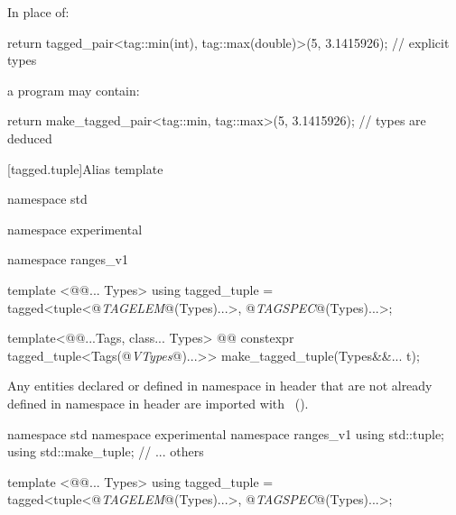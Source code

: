 {\begin{itemdescr}
\pnum
\enterexample
In place of:

\begin{codeblock}
  return tagged_pair<tag::min(int), tag::max(double)>(5, 3.1415926);   // explicit types
\end{codeblock}

a \Cpp program may contain:

\begin{codeblock}
  return make_tagged_pair<tag::min, tag::max>(5, 3.1415926);           // types are deduced
\end{codeblock}
\exitexample
\end{itemdescr}

{\color{newclr}
[tagged.tuple]{Alias template }


\begin{codeblock}
namespace std { namespace experimental { namespace ranges_v1 {
  template <@@... Types>
  using tagged_tuple = tagged<tuple<@\textit{TAGELEM}@(Types)...>,
                              @\textit{TAGSPEC}@(Types)...>;

  template<@@...Tags, class... Types>
    @@
      constexpr tagged_tuple<Tags(@\textit{VTypes}@)...>> make_tagged_tuple(Types&&... t);
}}}
\end{codeblock}

\pnum
Any entities declared or defined in namespace  in header 
that are not already defined in namespace  in header
 are imported with
~(). \enterexample
\begin{codeblock}
namespace std { namespace experimental { namespace ranges_v1 {
  using std::tuple;
  using std::make_tuple;
  // ... others
}}}
\end{codeblock}
\exitexample
}

\begin{codeblock}
template <@@... Types>
using tagged_tuple = tagged<tuple<@\textit{TAGELEM}@(Types)...>,
                            @\textit{TAGSPEC}@(Types)...>;
\end{codeblock}

\pnum {}

}
